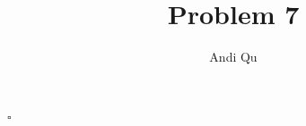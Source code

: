 \documentclass[11pt]{scrartcl}
\title{Problem 7}
\author{Andi Qu}
\newcommand*{\QED}{\hfill\ensuremath{\square}}%
\begin{document}
\maketitle



\QED
\end{document}

